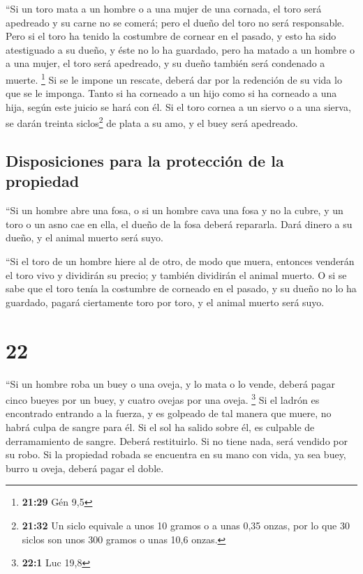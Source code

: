  ``Si un toro mata a un hombre o a una mujer de una
cornada, el toro será apedreado y su carne no se comerá; pero el dueño
del toro no será responsable.  Pero si el toro ha tenido
la costumbre de cornear en el pasado, y esto ha sido atestiguado a su
dueño, y éste no lo ha guardado, pero ha matado a un hombre o a una
mujer, el toro será apedreado, y su dueño también será condenado a
muerte. \footnote{\textbf{21:29} Gén 9,5}  Si se le
impone un rescate, deberá dar por la redención de su vida lo que se le
imponga.  Tanto si ha corneado a un hijo como si ha
corneado a una hija, según este juicio se hará con él. 
Si el toro cornea a un siervo o a una sierva, se darán treinta
siclos\footnote{\textbf{21:32} Un siclo equivale a unos 10 gramos o a
  unas 0,35 onzas, por lo que 30 siclos son unos 300 gramos o unas 10,6
  onzas.} de plata a su amo, y el buey será apedreado.

\hypertarget{disposiciones-para-la-protecciuxf3n-de-la-propiedad}{%
\subsection{Disposiciones para la protección de la
propiedad}\label{disposiciones-para-la-protecciuxf3n-de-la-propiedad}}

 ``Si un hombre abre una fosa, o si un hombre cava una
fosa y no la cubre, y un toro o un asno cae en ella,  el
dueño de la fosa deberá repararla. Dará dinero a su dueño, y el animal
muerto será suyo.

 ``Si el toro de un hombre hiere al de otro, de modo que
muera, entonces venderán el toro vivo y dividirán su precio; y también
dividirán el animal muerto.  O si se sabe que el toro
tenía la costumbre de corneado en el pasado, y su dueño no lo ha
guardado, pagará ciertamente toro por toro, y el animal muerto será
suyo.

\hypertarget{section-21}{%
\section{22}\label{section-21}}

 ``Si un hombre roba un buey o una oveja, y lo mata o lo
vende, deberá pagar cinco bueyes por un buey, y cuatro ovejas por una
oveja. \footnote{\textbf{22:1} Luc 19,8}  Si el ladrón es
encontrado entrando a la fuerza, y es golpeado de tal manera que muere,
no habrá culpa de sangre para él.  Si el sol ha salido
sobre él, es culpable de derramamiento de sangre. Deberá restituirlo. Si
no tiene nada, será vendido por su robo.  Si la propiedad
robada se encuentra en su mano con vida, ya sea buey, burro u oveja,
deberá pagar el doble.


